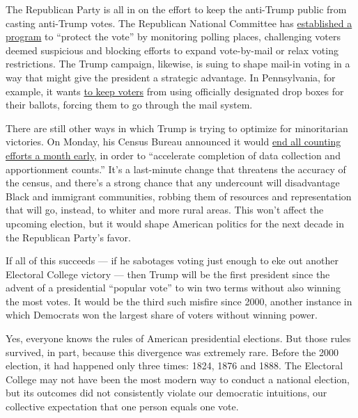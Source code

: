 The Republican Party is all in on the effort to keep the anti-Trump
public from casting anti-Trump votes. The Republican National Committee
has
\href{https://www.nytimes3xbfgragh.onion/2020/05/18/us/Voting-republicans-trump.html}{established
a program} to ``protect the vote'' by monitoring polling places,
challenging voters deemed suspicious and blocking efforts to expand
vote-by-mail or relax voting restrictions. The Trump campaign, likewise,
is suing to shape mail-in voting in a way that might give the president
a strategic advantage. In Pennsylvania, for example, it wants
\href{https://www.inquirer.com/politics/election/trump-campaign-lawsuit-pennsylvania-mail-ballots-20200629.html}{to
keep voters} from using officially designated drop boxes for their
ballots, forcing them to go through the mail system.

There are still other ways in which Trump is trying to optimize for
minoritarian victories. On Monday, his Census Bureau announced it would
\href{https://www.npr.org/2020/08/03/898548910/census-cut-short-a-month-rushes-to-finish-all-counting-efforts-by-sept-30}{end
all counting efforts a month early}, in order to ``accelerate completion
of data collection and apportionment counts.'' It's a last-minute change
that threatens the accuracy of the census, and there's a strong chance
that any undercount will disadvantage Black and immigrant communities,
robbing them of resources and representation that will go, instead, to
whiter and more rural areas. This won't affect the upcoming election,
but it would shape American politics for the next decade in the
Republican Party's favor.

If all of this succeeds --- if he sabotages voting just enough to eke
out another Electoral College victory --- then Trump will be the first
president since the advent of a presidential ``popular vote'' to win two
terms without also winning the most votes. It would be the third such
misfire since 2000, another instance in which Democrats won the largest
share of voters without winning power.

Yes, everyone knows the rules of American presidential elections. But
those rules survived, in part, because this divergence was extremely
rare. Before the 2000 election, it had happened only three times: 1824,
1876 and 1888. The Electoral College may not have been the most modern
way to conduct a national election, but its outcomes did not
consistently violate our democratic intuitions, our collective
expectation that one person equals one vote.

